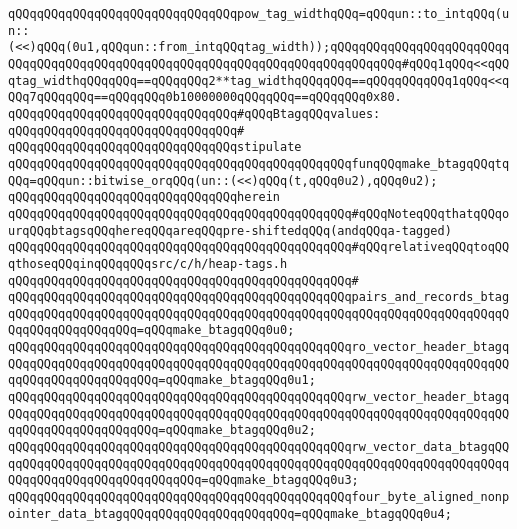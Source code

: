 \verb|qQQqqQQqqQQqqQQqqQQqqQQqqQQqqQQqpow_tag_widthqQQq=qQQqun::to_intqQQq(un::(<<)qQQq(0u1,qQQqun::from_intqQQqtag_width));qQQqqQQqqQQqqQQqqQQqqQQqqQQqqQQqqQQqqQQqqQQqqQQqqQQqqQQqqQQqqQQqqQQqqQQqqQQqqQQq#qQQq1qQQq<<qQQqtag_widthqQQqqQQq==qQQqqQQq2**tag_widthqQQqqQQq==qQQqqQQqqQQq1qQQq<<qQQq7qQQqqQQq==qQQqqQQq0b10000000qQQqqQQq==qQQqqQQq0x80.|\newline
\newline
\verb|qQQqqQQqqQQqqQQqqQQqqQQqqQQqqQQq#qQQqBtagqQQqvalues:|\newline
\verb|qQQqqQQqqQQqqQQqqQQqqQQqqQQqqQQq#|\newline
\verb|qQQqqQQqqQQqqQQqqQQqqQQqqQQqqQQqstipulate|\newline
\verb|qQQqqQQqqQQqqQQqqQQqqQQqqQQqqQQqqQQqqQQqqQQqqQQqfunqQQqmake_btagqQQqtqQQq=qQQqun::bitwise_orqQQq(un::(<<)qQQq(t,qQQq0u2),qQQq0u2);|\newline
\verb|qQQqqQQqqQQqqQQqqQQqqQQqqQQqqQQqherein|\newline
\verb|qQQqqQQqqQQqqQQqqQQqqQQqqQQqqQQqqQQqqQQqqQQqqQQq#qQQqNoteqQQqthatqQQqourqQQqbtagsqQQqhereqQQqareqQQqpre-shiftedqQQq(andqQQqa-tagged)|\newline
\verb|qQQqqQQqqQQqqQQqqQQqqQQqqQQqqQQqqQQqqQQqqQQqqQQq#qQQqrelativeqQQqtoqQQqthoseqQQqinqQQqqQQqsrc/c/h/heap-tags.h|\newline
\verb|qQQqqQQqqQQqqQQqqQQqqQQqqQQqqQQqqQQqqQQqqQQqqQQq#|\newline
\verb|qQQqqQQqqQQqqQQqqQQqqQQqqQQqqQQqqQQqqQQqqQQqqQQqpairs_and_records_btagqQQqqQQqqQQqqQQqqQQqqQQqqQQqqQQqqQQqqQQqqQQqqQQqqQQqqQQqqQQqqQQqqQQqqQQqqQQqqQQqqQQqqQQq=qQQqmake_btagqQQq0u0;|\newline
\verb|qQQqqQQqqQQqqQQqqQQqqQQqqQQqqQQqqQQqqQQqqQQqqQQqro_vector_header_btagqQQqqQQqqQQqqQQqqQQqqQQqqQQqqQQqqQQqqQQqqQQqqQQqqQQqqQQqqQQqqQQqqQQqqQQqqQQqqQQqqQQqqQQqqQQq=qQQqmake_btagqQQq0u1;|\newline
\verb|qQQqqQQqqQQqqQQqqQQqqQQqqQQqqQQqqQQqqQQqqQQqqQQqrw_vector_header_btagqQQqqQQqqQQqqQQqqQQqqQQqqQQqqQQqqQQqqQQqqQQqqQQqqQQqqQQqqQQqqQQqqQQqqQQqqQQqqQQqqQQqqQQqqQQq=qQQqmake_btagqQQq0u2;|\newline
\verb|qQQqqQQqqQQqqQQqqQQqqQQqqQQqqQQqqQQqqQQqqQQqqQQqrw_vector_data_btagqQQqqQQqqQQqqQQqqQQqqQQqqQQqqQQqqQQqqQQqqQQqqQQqqQQqqQQqqQQqqQQqqQQqqQQqqQQqqQQqqQQqqQQqqQQqqQQqqQQq=qQQqmake_btagqQQq0u3;|\newline
\verb|qQQqqQQqqQQqqQQqqQQqqQQqqQQqqQQqqQQqqQQqqQQqqQQqfour_byte_aligned_nonpointer_data_btagqQQqqQQqqQQqqQQqqQQqqQQq=qQQqmake_btagqQQq0u4;|\newline
